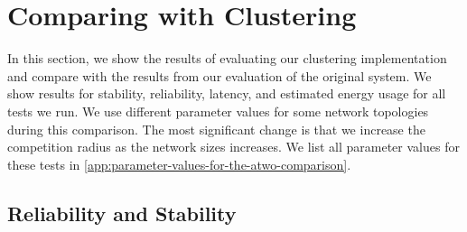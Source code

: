 \section{Comparing \atwo{} with Clustering}
\label{sec:comparing-a2-and-clustering}
In this section, we show the results of evaluating our clustering implementation and compare with the results from our evaluation of the original \atwo{} system. We show results for stability, reliability, latency, and estimated energy usage for all tests we run. We use different parameter values for some network topologies during this comparison. The most significant change is that we increase the competition radius as the network sizes increases. We list all parameter values for these tests in \cref{app:parameter-values-for-the-atwo-comparison}.


\subsection{Reliability and Stability}
\label{subsec:evaluation-reliability}
